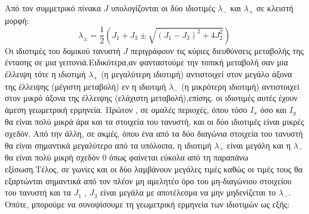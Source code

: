 \documentclass[12pt, a4paper]{article}
\begin{document}
Από τον συμμετρικό πίνακα $J$ υπολογίζονται οι δύο ιδιοτιμές
$\lambda_-$ και $\lambda_+$ σε κλειστή μορφή:
\begin{equation}
    \lambda_{\pm}
    = \frac{1}{2}
    \left(
        J_1 + J_3 \pm \sqrt{(J_1 - J_3)^2 + 4J_2^2}
    \right)
\end{equation}
Οι ιδιοτιμές του δομικού τανυστή $J$ περιγράφουν τις κύριες διευθύνσεις μεταβολής της έντασης σε μια γειτονιά.Ειδικότερα,αν φανταστούμε την τοπική μεταβολή σαν μια έλλειψη τότε η ιδιοτιμή $\lambda_+$ 
(η μεγαλύτερη ιδιοτιμή) αντιστοιχεί στον μεγάλο άξονα της έλλειψης (μέγιστη μεταβολή) εν η ιδιοτιμή  $\lambda_-$ (η μικρότερη ιδιοτιμή) αντιστοιχεί στον μικρό άξονα της έλλειψης (ελάχιστη μεταβολή),επίσης, οι ιδιοτιμές αυτές έχουν άμεση γεωμετρική ερμηνεία.
Πρώτον , σε ομαλές περιοχές, όπου τόσο $I_x$ όσο και $I_y$  θα είναι πολύ μικρά άρα και τα στοιχεία του τανυστή, και οι δύο ιδιοτιμές
είναι μικρές σχεδόν. Από την άλλη, σε ακμές, όπου ένα από τα δύο διαγώνια στοιχεία του τανυστή θα είναι σημαντικά μεγαλύτερο από τα  υπόλοιπα, η  ιδιοτιμή $\lambda_+$ είναι μεγάλη και η $\lambda_-$ θα είναι πολύ μικρή  σχεδόν 0 όπως φαίνεται εύκολα από τη παραπάνω εξίσωση.Τέλος,  σε γωνίες και 
οι δύο λαμβάνουν μεγάλες τιμές καθώς οι τιμές τους θα εξαρτώνται σημαντικά από τον πλέον μη αμελητέο όρο του μη-διαγώνιου στοιχείου του τανυστή και τα $J_1$ , $J_3$ είναι μεγάλα με αποτέλεσμα να μην μηδενίζεται το $\lambda_-$. Οπότε, μπορούμε να συνοψίσουμε τη γεωμετρική ερμηνεία των ιδιοτιμών ως εξής:
\end{document}
